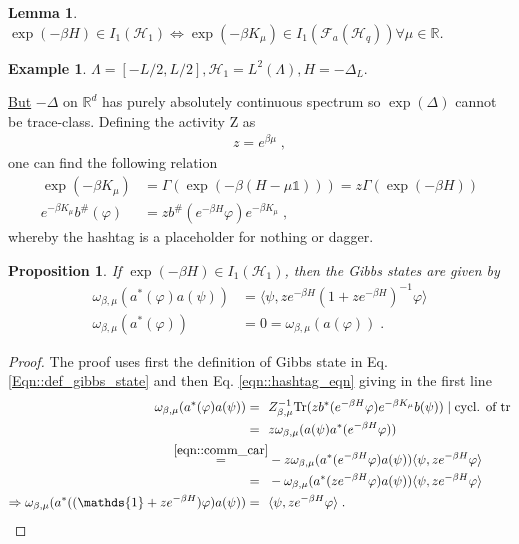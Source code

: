 \documentclass[
a4paper, %
11pt, %
onecolumn, %
openany, %
]{memoir}
\theoremstyle{definition}
\newtheorem{example}[definition]{Example}
\theoremstyle{remark}
\theoremstyle{plain}
\newtheorem{prop}[definition]{Proposition}
\newtheorem{lemma}[definition]{Lemma}
\begin{document}
\begin{lemma}
	$\exp(-\beta H)\in I_1(\mathcal{H}_1)\Leftrightarrow \exp(-\beta K_{\mu})\in I_1(\mathcal{F}_a(\mathcal{H}_q))\forall\mu\in \mathbb{R}$.
\end{lemma}
\begin{example}
	$\Lambda=[-L/2,L/2], \mathcal{H}_1=L^2(\Lambda), H=-\Delta_L$.

\underline{But} $-\Delta$ on $\mathbb{R}^d$ has purely absolutely continuous spectrum so $\exp(\Delta)$ cannot be trace-class. Defining the activity Z as \begin{align}
z=e^{\beta\mu}\; ,
\end{align}
one can find the following relation \begin{align}
\exp(-\beta K_{\mu})&=\Gamma(\exp(-\beta(H-\mu\mathds{1})))=z\Gamma(\exp(-\beta H))\\
e^{-\beta K_{\mu}}b^{\#}(\varphi)&=zb^{\#}(e^{-\beta H}\varphi)e^{-\beta K_{\mu}}\label{eqn::hashtag_eqn}\; ,
\end{align}
whereby the hashtag is a placeholder for nothing or dagger.
\begin{prop}
	If $\exp(-\beta H)\in I_1(\mathcal{H}_1)$, then the Gibbs states are given by\begin{align}
	\omega_{\beta,\mu}(a^{*}(\varphi)a(\psi))&=\langle \psi, ze^{-\beta H}(1+ze^{-\beta H})^{-1}\varphi\rangle\\
	\omega_{\beta,\mu}(a^*(\varphi))&=0=\omega_{\beta,\mu}(a(\varphi))\; .
	\end{align}
\end{prop}
\begin{proof}
	The proof uses first the definition of Gibbs state in Eq. \eqref{Eqn::def_gibbs_state} and then Eq. \eqref{eqn::hashtag_eqn} giving in the first line\begin{align}
	\omega_{\beta,\mu}(a^{*}(\varphi)a(\psi))=~~&Z^{-1}_{\beta,\mu}\mathrm{Tr}(zb^*(e^{-\beta H}\varphi)e^{-\beta K_{\mu}}b(\psi)) \mid \text{cycl. of tr}\\
	=~~&z\omega_{\beta,\mu}(a(\psi)a^*(e^{-\beta H}\varphi)) \\
	\overset{\eqref{eqn::comm_car}}{=}& -z\omega_{\beta,\mu}(a^*(e^{-\beta H}\varphi)a(\psi))\langle \psi, ze^{-\beta H}\varphi\rangle\\
	=~~&-\omega_{\beta,\mu}(a^*(ze^{-\beta H}\varphi)a(\psi))\langle \psi, ze^{-\beta H}\varphi\rangle\\
	\Rightarrow \omega_{\beta,\mu}(a^*((\mathds{1}+ze^{-\beta H})\varphi)a(\psi))=~~&\langle \psi, ze^{-\beta H} \varphi\rangle\; .

\end{align}
\end{proof}
\end{example}
\end{document}

